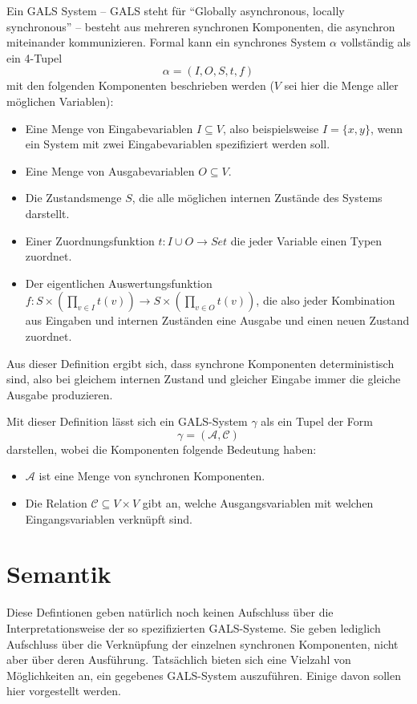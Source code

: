 Ein GALS System -- GALS steht für "`Globally asynchronous, locally synchronous"' -- besteht aus mehreren synchronen Komponenten, die asynchron miteinander kommunizieren.
Formal kann ein synchrones System $\alpha$ vollständig als ein 4-Tupel
\[ \alpha = (I,O,S,t,f) \]
mit den folgenden Komponenten beschrieben werden ($V$ sei hier die Menge aller möglichen Variablen):
\begin{itemize}
\item Eine Menge von Eingabevariablen $I\subseteq V$, also beispielsweise $I=\{x,y\}$, wenn ein System mit zwei Eingabevariablen spezifiziert werden soll.
\item Eine Menge von Ausgabevariablen $O\subseteq V$.
\item Die Zustandsmenge $S$, die alle möglichen internen Zustände des Systems darstellt.
\item Einer Zuordnungsfunktion $t : I\cup O\rightarrow {Set}$ die jeder Variable einen Typen zuordnet.
\item Der eigentlichen Auswertungsfunktion $f : S\times \left(\prod_{v\in I} t(v)\right)\rightarrow S\times\left(\prod_{v\in O} t(v)\right)$, die also jeder Kombination aus Eingaben und internen Zuständen eine Ausgabe und einen neuen Zustand zuordnet.
\end{itemize}
Aus dieser Definition ergibt sich, dass synchrone Komponenten deterministisch sind, also bei gleichem internen Zustand und gleicher Eingabe immer die gleiche Ausgabe produzieren.

Mit dieser Definition lässt sich ein GALS-System $\gamma$ als ein Tupel der Form
\[ \gamma = (\mathcal{A},\mathcal{C}) \]
darstellen, wobei die Komponenten folgende Bedeutung haben:
\begin{itemize}
\item $\mathcal{A}$ ist eine Menge von synchronen Komponenten.
\item Die Relation $\mathcal{C}\subseteq V\times V$ gibt an, welche Ausgangsvariablen mit welchen Eingangsvariablen verknüpft sind.
\end{itemize}

\section{Semantik}
Diese Defintionen geben natürlich noch keinen Aufschluss über die Interpretationsweise der so spezifizierten GALS-Systeme.
Sie geben lediglich Aufschluss über die Verknüpfung der einzelnen synchronen Komponenten, nicht aber über deren Ausführung.
Tatsächlich bieten sich eine Vielzahl von Möglichkeiten an, ein gegebenes GALS-System auszuführen.
Einige davon sollen hier vorgestellt werden.

